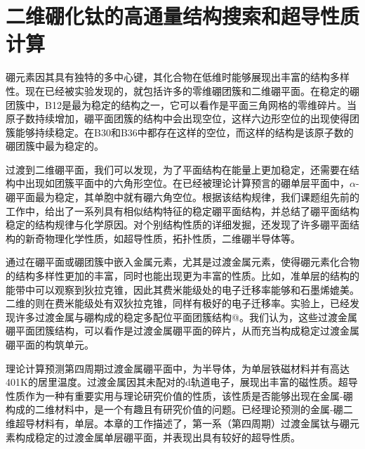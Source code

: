 \chapter{二维硼化钛的高通量结构搜索和超导性质计算}
\newcommand*{\rom}[1]{\uppercase\expandafter{\romannumeral #1\relax}}

硼元素因其具有独特的多中心键，其化合物在低维时能够展现出丰富的结构多样性。现在已经被实验发现的，就包括许多的零维硼团簇和二维硼平面。在稳定的硼团簇中，B12\cite{kiran2009origin}是最为稳定的结构之一，它可以看作是平面三角网格的零维碎片。当原子数持续增加，硼平面团簇的结构中会出现空位，这样六边形空位的出现使得团簇能够持续稳定。在B30和B36\cite{pham2014boron}中都存在这样的空位，而这样的结构是该原子数的硼团簇中最为稳定的。

过渡到二维硼平面，我们可以发现，为了平面结构在能量上更加稳定，还需要在结构中出现如团簇平面中的六角形空位。在已经被理论计算预言的硼单层平面中，$\alpha$-硼平面\cite{yang2008ab}最为稳定，其单胞中就有硼六角空位。根据该结构规律，我们课题组先前的工作中\cite{xu2017practical}，给出了一系列具有相似结构特征的稳定硼平面结构，并总结了硼平面结构稳定的结构规律与化学原因。对个别结构性质的详细发掘，还发现了许多硼平面结构的新奇物理化学性质，如超导性质\cite{penev2016can,zhao2016superconductivity}，拓扑性质\cite{feng2017dirac}，二维硼半导体\cite{xu2017two}等。

通过在硼平面或硼团簇中嵌入金属元素，尤其是过渡金属元素，使得硼元素化合物的结构多样性更加的丰富，同时也能出现更为丰富的性质。比如，准单层的结构的能带中可以观察到狄拉克锥\cite{zhang2014prediction}，因此其费米能级处的电子迁移率能够和石墨烯媲美。二维的\cite{xie2014first}则在费米能级处有双狄拉克锥，同样有极好的电子迁移率。实验上，已经发现许多过渡金属与硼构成的稳定多配位平面团簇结构@。我们认为，这些过渡金属硼平面团簇结构，可以看作是过渡金属硼平面的碎片，从而充当构成稳定过渡金属硼平面的构筑单元。

理论计算预测第四周期过渡金属硼平面中，\cite{li2016global}为半导体，\cite{li2019room}为单层铁磁材料并有高达401K的居里温度。过渡金属因其未配对的d轨道电子，展现出丰富的磁性质。超导性质作为一种有重要实用与理论研究价值的性质，该性质是否能够出现在金属-硼构成的二维材料中，是一个有趣且有研究价值的问题。已经理论预测的金属-硼二维超导材料有\cite{yan2019prediction}，单层\cite{wu2016lithium}。本章的工作描述了，第一系（第四周期）过渡金属钛与硼元素构成稳定的过渡金属单层硼平面，并表现出具有较好的超导性质。

